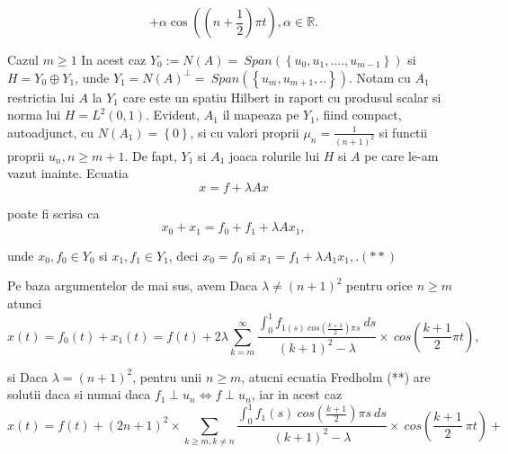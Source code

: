 \documentclass[a4paper,12pt,oneside]{report}
\begin{document}
\begin{enumerate}
		      	\begin{displaymath}
		      		+ \alpha  \cos \left ( \left ( n + \frac{1}{2} \right )\pi t \right ), \alpha \in \mathbb{R}.
		      	\end{displaymath}
		      	
		      			      			      	 
		      			      			      	
		      	Cazul \(m\geq 1\)
		      	In acest caz \(Y_{0} := N\left ( A \right ) = \ Span\left ( \left \{ u_{0},u_{1},....,u_{m-1} \right \} \right )\) si \(H = Y_{0} \oplus Y_{1}\), unde  \(Y_{1} = N\left ( A \right )^{\perp } = \ Span \left ( \left \{ u_{m}, u_{m+1},.. \right \} \right )\).
		      	Notam cu \(A_{1}\) restrictia lui \(A\) la \(Y_{1}\) care este un spatiu Hilbert in raport cu produsul scalar si norma lui \(H  = L^{2}\left ( 0,1 \right )\). Evident, \(A_{1}\) il mapeaza pe \(Y_{1}\), fiind compact, autoadjunct, cu \(N\left ( A_{1} \right ) = \left \{ 0 \right \}\), si cu valori proprii \(\mu _{n} = \frac{1}{\left ( n+1 \right )^{2}}\) si functii proprii \(u_{n}, n\geq m+1\). De fapt, \(Y_{1}\) si \(A_{1}\) joaca rolurile lui \(H\) si \(A\) pe care le-am vazut inainte. 
		      	Ecuatia 
		      	\begin{displaymath}
		      		x = f + \lambda Ax
		      	\end{displaymath}
		      			      			      	
		      	poate fi scrisa ca
		      	\begin{displaymath}
		      		x_{0} + x_{1} = f_{0} + f_{1} + \lambda Ax_{1},
		      	\end{displaymath}
		      			      			      	
		      	unde \(x_{0} ,f_{0} \in Y_{0}\) si \(x_{1} ,f_{1} \in Y_{1}\), deci \(x_{0} = f_{0}\) si
		      	\(x_{1} = f_{1} + \lambda A_{1}x_{1},.(**)\)
		      			      			      	
		      	Pe baza argumentelor de mai sus, avem
		      	Daca \(\lambda \neq \left ( n+1 \right )^{2}\) pentru orice \(n\geq m\) atunci
		      	\begin{displaymath}
		      		x\left ( t \right ) = f_{0}\left ( t \right ) + x_{1}\left ( t \right ) = f\left ( t \right ) + 2 \lambda \sum_{k=m}^{\infty }\frac{\int_{0}^{1}f_{1\left ( s \right ) \ cos\left ( \frac{k+1}{2} \right )\pi s }\ ds}{\left ( k+1 \right )^{2} - \lambda }\times \ cos \left ( \frac{k+1}{2}\pi t \right ),
		      	\end{displaymath}
		      			      			      	 
		      	si 
		      	Daca \(\lambda = \left ( n+1 \right )^{2}\), pentru unii \(n\geq m\), atucni ecuatia Fredholm (**) are solutii daca si numai daca \(f_{1} \perp u_{n} \Leftrightarrow f \perp u_{n}\), iar in acest caz 
		      	\begin{displaymath}
		      		x\left ( t \right ) = f\left ( t \right ) + \left ( 2n+1 \right )^{2} \times \sum_{k\geq m,k\neq n}\frac{\int_{0}^{1}f_{1}\left ( s \right ) \ cos \left ( \frac{k+1}{2} \right ) \pi s \ ds}{\left ( k+1 \right )^{2} - \lambda } \times  \ cos \left ( \frac{k+1}{2}\ \pi t  \right ) +
		      	\end{displaymath}
		      			      			      	

\end{enumerate}
\end{document}
